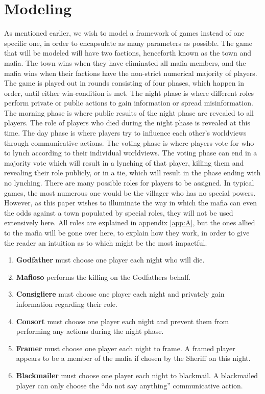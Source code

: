 \section{Modeling}
As mentioned earlier, we wish to model a framework of games instead of one
specific one, in order to encapsulate as many parameters as possible. The game
that will be modeled will have two factions, henceforth known as the town and
mafia. The town wins when they have eliminated all mafia members, and the mafia
wins when their factions have the non-strict numerical majority of players. The
game is played out in rounds consisting of four phases, which happen in order,
until either win-condition is met. The night phase is where different roles
perform private or public actions to gain information or spread misinformation.
The morning phase is where public results of the night phase are revealed to
all players. The role of players who died during the night phase is revealed at
this time. The day phase is where players try to influence each other's
worldviews through communicative actions. The voting phase is where players
vote for who to lynch according to their individual worldviews. The voting
phase can end in a majority vote which will result in a lynching of that
player, killing them and revealing their role publicly, or in a tie, which will
result in the phase ending with no lynching. There are many possible roles for 
players to be assigned. In typical games, the most numerous one would be the 
villager who has no special powers. However, as this paper wishes to illuminate 
the way in which the mafia can even the odds against a town populated by 
special roles, they will not be used extensively here. All roles are explained 
in appendix \ref{app:A}, but the ones allied to the mafia will be gone over 
here, to explain how they work, in order to give the reader an intuition as to 
which might be the most impactful.\\ 
\begin{enumerate}
	\item\textbf{Godfather} must choose one player each night who will die.
	\item\textbf{Mafioso} performs the killing on the Godfathers behalf.
	\item\textbf{Consigliere} must choose one player each night and privately 
	gain information regarding their role. 
	\item\textbf{Consort} must choose one player each night and prevent them 
	from performing any actions during the night phase.
	\item\textbf{Framer} must choose one player each night to frame. A framed 
	player appears to be a member of the mafia if chosen by the Sheriff on this 
	night.
	\item\textbf{Blackmailer} must choose one player each night to blackmail. A 
	blackmailed player can only choose the “do not say anything” communicative 
	action. 
\end{enumerate}

